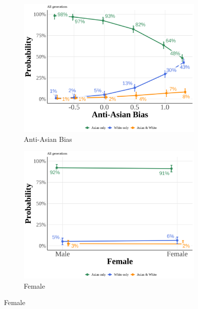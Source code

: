 \begin{center}
\begin{figure}[!htb]
\centering
\caption{Predicted Probabilities: All Generations}
\label{fig:pp-all-gen}

\begin{subfigure}{.48\textwidth}
\caption{Anti-Asian Bias}
\centering
\includegraphics[width=1\linewidth]{simple_pp_value_all.png}
\end{subfigure}
\hfill
\begin{subfigure}{.48\textwidth}
\caption{Female}
\centering
\includegraphics[width=1\linewidth]{simple_pp_Female_all.png}
\end{subfigure}


\end{figure}
\end{center}
